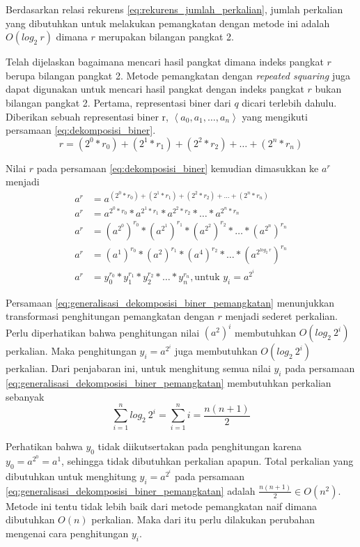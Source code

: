 Berdasarkan relasi rekurens \eqref{eq:rekurens_jumlah_perkalian}, jumlah perkalian yang dibutuhkan untuk melakukan pemangkatan dengan metode ini adalah $O(log_2\ r)$ dimana $r$ merupakan bilangan pangkat 2.

Telah dijelaskan bagaimana mencari hasil pangkat dimana indeks pangkat $r$ berupa bilangan pangkat 2. Metode pemangkatan dengan \textit{repeated squaring} juga dapat digunakan untuk mencari hasil pangkat dengan indeks pangkat $ r $ bukan bilangan pangkat 2. Pertama, representasi biner dari $ q $ dicari terlebih dahulu. Diberikan sebuah representasi biner r, $ \left\langle a_0,a_1,\dots,a_n\right\rangle $ yang mengikuti persamaan \eqref{eq:dekomposisi_biner}.
\begin{equation}
r = (2^0 * r_0) + (2^1* r_1) + (2^2 * r_2) + \dots + (2^n* r_n)
\label{eq:dekomposisi_biner}
\end{equation}

Nilai $ r $ pada persamaan \eqref{eq:dekomposisi_biner} kemudian dimasukkan ke $ a^r $ menjadi
\begin{align}
a^r &= a^{(2^0 * r_0) + (2^1 * r_1) + (2^2 * r_2) + \dots + (2^n * r_n)} \\
a^r &= a^{2^0 * r_0} * a^{2^1 * r_1} * a^{2^2 * r_2} * \dots * a^{2^n * r_n} \\ 
a^r &= (a^{2^0})^{r_0} * (a^{2^1})^{r_1} * (a^{2^2})^{r_2} * \dots * (a^{2^n})^{r_n} \\
a^r &= (a^1)^{r_0} * (a^2)^{r_1} * (a^4)^{r_2} * \dots * (a^{2^{log_2\ r}})^{r_n} \\
a^r &= y_0^{r_0} * y_1^{r_1} * y_2^{r_2} * \dots * y_n^{r_n},\text{untuk } y_i=a^{2^i}
\label{eq:generalisasi_dekomposisi_biner_pemangkatan}
\end{align}

Persamaan \eqref{eq:generalisasi_dekomposisi_biner_pemangkatan} menunjukkan transformasi penghitungan pemangkatan dengan $ r $ menjadi sederet perkalian. Perlu diperhatikan bahwa penghitungan nilai $ (a^2)^i $ membutuhkan $ O(log_2\ 2^i) $ perkalian. Maka penghitungan $ y_i=a^{2^i} $ juga membutuhkan $ O(log_2\ 2^i) $ perkalian. Dari penjabaran ini, untuk menghitung semua nilai $ y_i $ pada persamaan \eqref{eq:generalisasi_dekomposisi_biner_pemangkatan} membutuhkan perkalian sebanyak
\begin{equation}
\sum_{i=1}^{n} log_2\ {2^i}=\sum_{i=1}^{n} i=\frac{n(n+1)}{2}
\label{eq:jumlah_perkalian_generalisasi_dekomposisi_biner}
\end{equation}

Perhatikan bahwa $ y_0 $ tidak diikutsertakan pada penghitungan karena $ y_0=a^{2^0}=a^1 $, sehingga tidak dibutuhkan perkalian apapun. Total perkalian yang dibutuhkan untuk menghitung $ y_i=a^{2^i} $ pada persamaan \eqref{eq:generalisasi_dekomposisi_biner_pemangkatan} adalah $ \frac{n(n+1)}{2} \in O(n^2) $. Metode ini tentu tidak lebih baik dari metode pemangkatan naif dimana dibutuhkan $ O\left(n\right) $ perkalian. Maka dari itu perlu dilakukan perubahan mengenai cara penghitungan $ y_i $.

